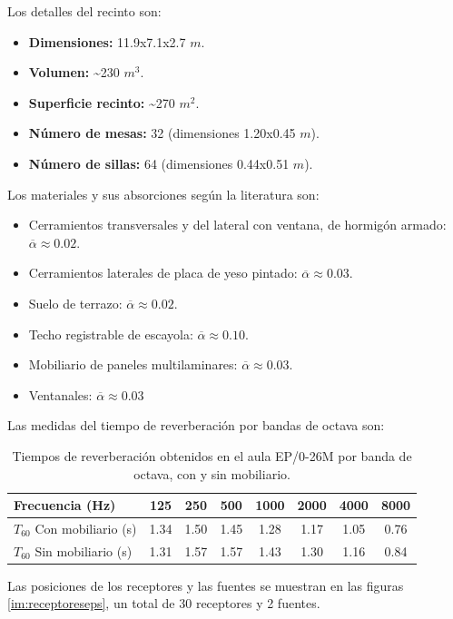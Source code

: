 Los detalles del recinto son:
\begin{itemize}
\itemsep0em
  \item \textbf{Dimensiones:} 11.9x7.1x2.7 $m$.
  \item \textbf{Volumen:} \textasciitilde230 $m^3$.
  \item \textbf{Superficie recinto:} \textasciitilde270 $m^2$.
  \item \textbf{Número de mesas:} 32 (dimensiones 1.20x0.45 $m$).
  \item \textbf{Número de sillas:} 64 (dimensiones 0.44x0.51 $m$).
\end{itemize}

Los materiales y sus absorciones según la literatura son:
\begin{itemize}
\itemsep0em
  \item Cerramientos transversales y del lateral con ventana, de hormigón armado: $\overline{\alpha}\approx0.02$.
  \item Cerramientos laterales de placa de yeso pintado: $\overline{\alpha}\approx0.03$.
  \item Suelo de terrazo: $\overline{\alpha}\approx0.02$.
  \item Techo registrable de escayola: $\overline{\alpha}\approx0.10$.
  \item Mobiliario de paneles multilaminares: $\overline{\alpha}\approx0.03$.
  \item Ventanales: $\overline{\alpha}\approx0.03$
\end{itemize}

Las medidas del tiempo de reverberación por bandas de octava son:

\begin{table}[ht]
\centering
{
\begin{tabular}{@{}lccccccc@{}}
\toprule
Frecuencia (Hz) & 125 & 250 & 500 & 1000 & 2000 & 4000 & 8000 \\ \midrule
$T_{60}$ Con mobiliario (s) & 1.34 & 1.50 & 1.45 & 1.28 & 1.17 & 1.05 & 0.76 \\
$T_{60}$ Sin mobiliario (s) & 1.31 & 1.57 & 1.57 & 1.43 & 1.30 & 1.16 & 0.84 \\ \bottomrule
\end{tabular}
}
\caption{Tiempos de reverberación obtenidos en el aula EP/0-26M por banda de octava, con y sin mobiliario.}
\label{tab:reveps}
\end{table}

Las posiciones de los receptores y las fuentes se muestran en las figuras \ref{im:receptoreseps}, un total de 30 receptores y 2 fuentes.

